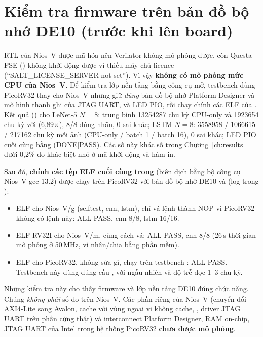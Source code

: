 \section{Kiểm tra firmware trên bản đồ bộ nhớ DE10 (trước khi lên board)}
\label{sec:de10-fwsim}
RTL của Nios~V được mã hóa nên Verilator không mô phỏng được, còn Questa FSE () không khởi động được vì thiếu máy chủ licence (``SALT\_LICENSE\_SERVER not set''). Vì vậy \textbf{không có mô phỏng mức CPU của Nios~V}. Để kiểm tra lớp nền tảng bằng công cụ mở, testbench  dùng PicoRV32 thay cho Nios~V nhưng giữ \emph{đúng} bản đồ bộ nhớ Platform Designer và mô hình thanh ghi của JTAG UART,  và LED PIO, rồi chạy chính các ELF của . Kết quả () cho LeNet-5 $N=8$: trung bình \num{13254287} chu kỳ CPU-only và \num{1923654} chu kỳ với \NPU{} (6,89$\times$), 8/8 đúng nhãn, 0 sai khác; LSTM $N=8$: \num{3558958} / \num{1066615} / \num{217162} chu kỳ mỗi ảnh (CPU-only / batch 1 / batch 16), 0 sai khác; LED PIO cuối cùng bằng  (DONE|PASS). Các số này khác số trong Chương~\ref{ch:results} dưới 0,2\% do khác biệt nhỏ ở mã khởi động và hàm in.

Sau đó, \textbf{chính các tệp ELF cuối cùng trong } (biên dịch bằng bộ công cụ Nios~V gcc 13.2) được chạy trên PicoRV32 với bản đồ bộ nhớ DE10 và \NPU{}  (log trong ):
\begin{itemize}
  \item ELF cho Nios~V/g (selftest, cnn, lstm), chỉ vá lệnh  thành NOP vì PicoRV32 không có lệnh này: ALL PASS, cnn 8/8, lstm 16/16.
  \item ELF RV32I cho Nios~V/m, cùng cách vá: ALL PASS, cnn 8/8 (26\,s thời gian mô phỏng ở 50\,MHz, vì nhân/chia bằng phần mềm).
  \item ELF cho PicoRV32, không sửa gì, chạy trên testbench : ALL PASS. Testbench này dùng đúng cầu , với  ngẫu nhiên và độ trễ đọc 1--3 chu kỳ.
\end{itemize}
Những kiểm tra này cho thấy firmware và lớp nền tảng DE10 đúng chức năng. Chúng \emph{không phải} số đo trên Nios~V. Các phần riêng của Nios~V (chuyển đổi AXI4-Lite sang Avalon, cache với vùng ngoại vi không cache, , driver JTAG UART trên phần cứng thật) và interconnect Platform Designer, RAM on-chip, JTAG UART của Intel trong hệ thống PicoRV32 \textbf{chưa được mô phỏng}.

